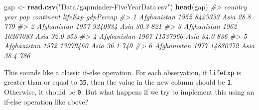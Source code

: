 \documentclass[]{book}
\newenvironment{Shaded}{\begin{snugshade}}{\end{snugshade}}
\newcommand{\KeywordTok}[1]{\textcolor[rgb]{0.13,0.29,0.53}{\textbf{#1}}}
\newcommand{\DataTypeTok}[1]{\textcolor[rgb]{0.13,0.29,0.53}{#1}}
\newcommand{\DecValTok}[1]{\textcolor[rgb]{0.00,0.00,0.81}{#1}}
\newcommand{\StringTok}[1]{\textcolor[rgb]{0.31,0.60,0.02}{#1}}
\newcommand{\CommentTok}[1]{\textcolor[rgb]{0.56,0.35,0.01}{\textit{#1}}}
\newcommand{\ControlFlowTok}[1]{\textcolor[rgb]{0.13,0.29,0.53}{\textbf{#1}}}
\newcommand{\OperatorTok}[1]{\textcolor[rgb]{0.81,0.36,0.00}{\textbf{#1}}}
\newcommand{\NormalTok}[1]{#1}
\begin{document}
\begin{Shaded}
\begin{Highlighting}[]
\NormalTok{gap <-}\StringTok{ }\KeywordTok{read.csv}\NormalTok{(}\StringTok{"Data/gapminder-FiveYearData.csv"}\NormalTok{)}
\KeywordTok{head}\NormalTok{(gap)}
\CommentTok{#>       country year      pop continent lifeExp gdpPercap}
\CommentTok{#> 1 Afghanistan 1952  8425333      Asia    28.8       779}
\CommentTok{#> 2 Afghanistan 1957  9240934      Asia    30.3       821}
\CommentTok{#> 3 Afghanistan 1962 10267083      Asia    32.0       853}
\CommentTok{#> 4 Afghanistan 1967 11537966      Asia    34.0       836}
\CommentTok{#> 5 Afghanistan 1972 13079460      Asia    36.1       740}
\CommentTok{#> 6 Afghanistan 1977 14880372      Asia    38.4       786}
\end{Highlighting}
\end{Shaded}

This sounds like a classic if-else operation. For each observation, if
\texttt{lifeExp} is greater than or equal to \texttt{35}, then the value
in the new column should be \texttt{1}. Otherwise, it should be
\texttt{0}. But what happens if we try to implement this using an
if-else operation like above?

\begin{Shaded}
\end{Shaded}
\end{document}

